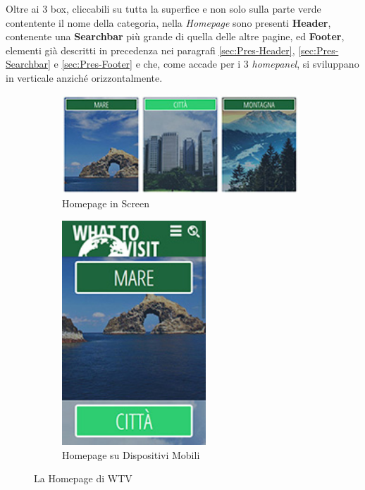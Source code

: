 Oltre ai 3 box, cliccabili su tutta la superfice e non solo sulla parte verde contentente il nome della categoria, nella \textit{Homepage} sono presenti \textbf{Header}, contenente una \textbf{Searchbar} più grande di quella delle altre pagine, ed \textbf{Footer}, elementi già descritti in precedenza nei paragrafi \ref{sec:Pres-Header}, \ref{sec:Pres-Searchbar} e \ref{sec:Pres-Footer} e che, come accade per i 3 \textit{homepanel}, si sviluppano in verticale anziché orizzontalmente.
\begin{figure}[h!]
        \centering
        \begin{subfigure}[b]{0.3\textwidth}
                \includegraphics[height=3.7cm,width=8.9cm]{images/pres_home.jpg}
                \caption{Homepage in Screen}
                \label{fig:Home-screen}
        \end{subfigure}
        \hspace{5cm}
        \begin{subfigure}[b]{0.3\textwidth}
                \includegraphics[height=8.43cm,width=5.4cm]{images/pres_home_m.jpg}
                \caption{Homepage su Dispositivi Mobili}
                \label{fig:Home-mobile}
        \end{subfigure}
        \caption{La Homepage di WTV}\label{fig:Display-Home}
\end{figure}

